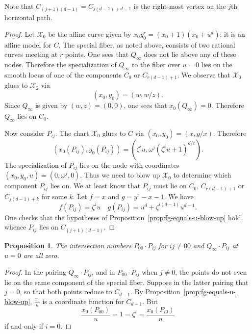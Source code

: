 \documentclass[reqno]{amsart}
\newtheorem{proposition}[thm]{Proposition}
\theoremstyle{definition}
\theoremstyle{remark}
\def\XX{\mathcal{X}}
\begin{document}
Note that $C_{(j+1)(d-1)} = C_{j(d-1) + d-1}$ is the right-most vertex on the $j$th horizontal path.

\begin{proof}
  Let $\XX_0$ be the affine curve given by $x_0 y_0^r = (x_0+1)(x_0+u^d)$; it is an affine model for $C$. The special fiber, as noted above, consists of two rational curves meeting at $r$ points. One sees that $Q_\infty$ does not lie above any of these nodes. Therefore the specialization of $Q_\infty$ to the fiber over $u = 0$ lies on the smooth locus of one of the components $C_0$ or $C_{r(d-1)+1}$. We observe that $\XX_0$ glues to $\XX_2$ via
  \[
  (x_0, y_0) = (w, w/z).
  \]
  Since $Q_\infty$ is given by $(w, z) = (0, 0)$, one sees that $x_0(Q_\infty) = 0$. Therefore $Q_\infty$ lies on $C_0$.

  Now consider $P_{ij}$. The chart $\XX_0$ glues to $C$ via $(x_0, y_0) = (x, y/x)$. Therefore
  \[
  (x_0(P_{ij}), y_0(P_{ij})) = (\zeta^i u, \omega^j(\zeta^iu + 1)^{d/r}).
  \]
  The specialization of $P_{ij}$ lies on the node with coordinates $(x_0, y_0, u) = (0, \omega^j, 0)$. Thus we need to blow up $\XX_0$ to determine which component $P_{ij}$ lies on. We at least know that $P_{ij}$ must lie on $C_0$, $C_{r(d-1)+1}$ or $C_{j(d-1) + k}$ for some $k$. Let $f = x$ and $g = y^r - x - 1$. We have
  \[
  f(P_{ij}) = \zeta^i u \quad g(P_{ij}) = u^d + \zeta^{i(d-1)} u^{d-1}.
  \]
  One checks that the hypotheses of Proposition~\ref{prop:fg-equals-u-blow-up} hold, whence $P_{ij}$ lies on $C_{(j+1)(d-1)}$.
\end{proof}

\begin{proposition}\label{prop:local-intersections-u-0}
  The intersection numbers $P_{00} \cdot P_{ij}$ for $ij \neq 00$ and $Q_{\infty} \cdot P_{ij}$ at $u = 0$ are all zero.
\end{proposition}

\begin{proof}
  In the pairing $Q_\infty \cdot P_{ij}$, and in $P_{00} \cdot P_{ij}$ when $j \neq 0$, the points do not even lie on the same component of the special fiber. Suppose in the latter pairing that $j = 0$, so that both points reduce to $C_{d-1}$. By Proposition~\ref{prop:fg-equals-u-blow-up}, $\frac{x_0}{u}$ is a coordinate function for $C_{d-1}$. But
  \[
  \frac{x_0(P_{00})}{u} = 1 = \zeta^i = \frac{x_0(P_{i0})}{u}
  \]
  if and only if $i = 0$.
\end{proof}
\end{document}
